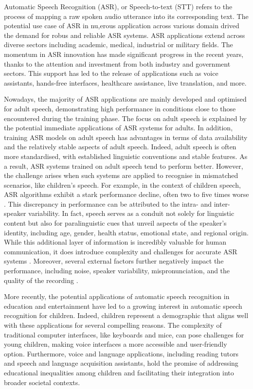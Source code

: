 \label{chap:Chapter2}
\cleardoublepage
Automatic Speech Recognition (ASR), or Speech-to-text (STT) refers to the process of mapping a raw spoken audio utterance into its corresponding text. The potential use case of ASR in nu,erous application across various domain drived the demand for robus and reliable ASR systems. ASR applications extend across diverse sectors including academic, medical, industrial or military fields. The momentum in ASR innovation has made significant progress in the recent years, thanks to the attention and investment from both industry and government sectors. This support has led to the release of applications such as voice assistants, hands-free interfaces, healthcare assistance, live translation, and more.

Nowadays, the majority of ASR applications are mainly developed and optimised for adult speech, demonstrating high performance in conditions close to those encountered during the training phase. The focus on adult speech is explained by the potential immediate applications of ASR systems for adults. In addition, training ASR models on adult speech has advantages in terms of data availability and the relatively stable aspects of adult speech. Indeed, adult speech is often more standardised, with established linguistic conventions and stable features. As a result, ASR systems trained on adult speech tend to perform better.
However, the challenge arises when such systems are applied to recognise in mismatched scenarios, like children's speech. For example, in the context of children speech, ASR algorithms exhibit a stark performance decline, often two to five times worse \cite{childrenSpeechWorse}. This discrepancy in performance can be attributed to the intra- and inter-speaker variability. In fact, speech serves as a conduit not solely for linguistic content but also for paralinguistic cues that unveil aspects of the speaker's identity, including age, gender, health status, emotional state, and regional origin. While this additional layer of information is incredibly valuable for human communication, it does introduce complexity and challenges for accurate ASR systems \cite{li2023asr}.
Moreover, several external factors further negatively impact the performance, including noise, speaker variability, mispronunciation, and the quality of the recording \cite{li2014overview,king2017robust}.


More recently, the potential applications of automatic speech recognition in education and entertainment have led to a growing interest in automatic speech recognition for children. Indeed, children represent a demographic that aligns well with these applications for several compelling reasons. The complexity of traditional computer interfaces, like keyboards and mice, can pose challenges for young children, making voice interfaces a more accessible and user-friendly option. Furthermore, voice and language applications, including reading tutors and speech and language acquisition assistants, hold the promise of addressing educational inequalities among children and facilitating their integration into broader societal contexts.

